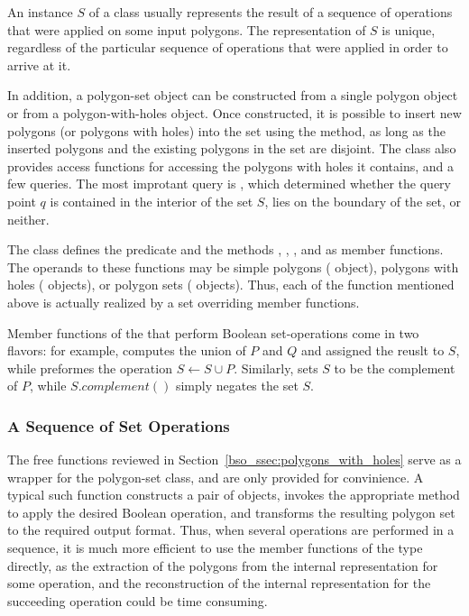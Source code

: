 An instance $S$ of a  class usually represents
the result of a sequence of operations that were applied on some input
polygons. The representation of $S$ is unique, regardless of the particular
sequence of operations that were applied in order to arrive at it.

In addition, a polygon-set object can be constructed from a single
polygon object or from a polygon-with-holes object. Once constructed,
it is possible to insert new polygons (or polygons with holes)
into the set using the  method, as long as the inserted
polygons and the existing polygons in the set are disjoint. 
The  class also provides access functions for
accessing the polygons with holes it contains, and a few queries. The
most improtant query is , which determined
whether the query point $q$ is contained in the interior of the set
$S$, lies on the boundary of the set, or neither.

The  class defines the predicate
 and the methods , ,
,  and  as member
functions. The operands to these functions may be simple polygons 
( object), polygons with holes
( objects), or polygon sets
( objects). Thus, each of the function
mentioned above is actually realized by a set overriding member
functions.

Member functions of the  that perform
Boolean set-operations come in two flavors: for example, 
computes the union of $P$ and $Q$ and assigned the reuslt to $S$, while
 preformes the operation $S \longleftarrow S \cup P$.
Similarly,  sets $S$ to be the complement of $P$,
while $S.complement()$ simply negates the set $S$.

\subsubsection{A Sequence of Set Operations}
\label{bso_sssec:sequence}

The free functions reviewed in Section~\ref{bso_ssec:polygons_with_holes}
serve as a wrapper for the polygon-set class, and are only provided for
convinience. A typical such function constructs a pair of
 objects, invokes the appropriate method to
apply the desired Boolean operation, and transforms the resulting
polygon set to the required output format. Thus, when several
operations are performed in a sequence, it is much more efficient to
use the member functions of the  type
directly, as the extraction of the polygons from the internal
representation for some operation, and the reconstruction of the
internal representation for the succeeding operation could be time
consuming.

